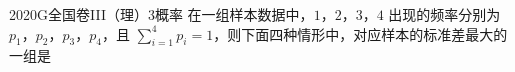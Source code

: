 
\begin{problem}{2020}{G}{全国卷III（理）}{3}{概率}
在一组样本数据中，$1$，$2$，$3$，$4$ 出现的频率分别为 $ p_1 $，$ p_2 $，$ p_3 $，$ p_4 $，且 $ \displaystyle \sum_{i=1}^{4} p_i = 1 $，则下面四种情形中，对应样本的标准差最大的一组是
\begin{choices}
\end{choices}
\end{problem}

\begin{answer}

\end{answer}

\begin{solutions}

\end{solutions}